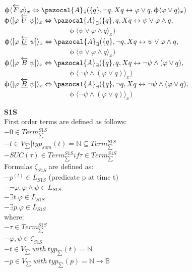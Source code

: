 \documentclass{article}
\newcommand{\Ab}{\pazocal{A}}
\begin{document}
\begin{multicols}{4}
$\upphi \langle \overleftarrow{F}\varphi\rangle_x \Leftrightarrow \Ab_\exists (\{q\},\neg q, X q \leftrightarrow \varphi \vee q,\upphi \langle \varphi \vee q \rangle_x)$
$\upphi \langle [\varphi \; \overleftarrow{U} \; \psi] \rangle_x \Leftrightarrow \Ab_\exists (\{q\},q, X q \leftrightarrow \psi \vee \varphi \wedge q, $\\ $\quad\qquad\qquad\qquad\qquad \upphi \langle \psi \vee \varphi \wedge q \rangle_x)$
$\upphi \langle [\varphi \; \overleftarrow{\underline{U}} \; \psi] \rangle_x \Leftrightarrow \Ab_\exists (\{q\},\neg q, X q \leftrightarrow \psi \vee \varphi \wedge q, $\\ $\quad\qquad\qquad\qquad\qquad \upphi \langle \psi \vee \varphi \wedge q \rangle_x)$
$\upphi \langle [\varphi\;\overleftarrow{B} \; \psi] \rangle_x \Leftrightarrow \Ab_\exists (\{q\},q, X q \leftrightarrow \neg\psi \wedge (\varphi \vee q),$\\ $\quad\qquad\qquad\qquad\qquad \upphi \langle \neg \psi \wedge (\varphi \vee q) \rangle_x)$
$\upphi \langle [\varphi\;\underline{\overleftarrow{B}} \; \psi] \rangle_x \Leftrightarrow \Ab_\exists (\{q\},\neg q, X q \leftrightarrow \neg\psi \wedge (\varphi \vee q),$\\ $\quad\qquad\qquad\qquad\qquad \upphi \langle \neg \psi \wedge (\varphi \vee q) \rangle_x)$



\textbf{S1S} \\
First order terms are defined as follows: \\
$-0 \in Term _{\sum}^{S1S} $\\
$-{\textit{t} \in V_{\sum} | typ_{sum}(\textit{t}) = \mathbb{N}} \subseteq Term _{\sum}^{S1S} $ \\
$-SUC(\tau) \in Term _{\sum}^{S1S} if \tau \in Term _{\sum}^{S1S}$ \\
Formulas $\zeta_{S1S}$ are defined as: \\
$-p^{(t)} \in L_{S1S}$ (predicate p at time t)\\
$-\neg\varphi, \varphi \wedge \psi \in L_{S1S}$ \\
$-\exists t. \varphi \in L_{S1S} $ \\
$-\exists p. \varphi \in L_{S1S} $ \\
where: \\
$-\tau \in Term _{\sum}^{S1S} $ \\
$-\varphi, \psi \in \zeta_{S1S} $ \\
$-t \in V_{\sum} \ with \ typ_{\sum}(t) = \mathbb{N}$ \\
$-p \in V_{\sum} \ with \ typ_{\sum}(p) = \mathbb{N} \rightarrow \mathbb{B}$ \\


\end{multicols}
\end{document}
